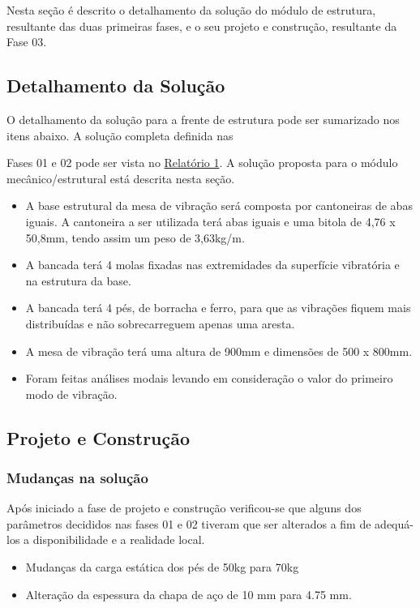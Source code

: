 \label{desenvolvimento_estrutura}
Nesta seção é descrito o detalhamento da solução do módulo de estrutura, resultante das duas primeiras fases,
e o seu projeto e construção, resultante da Fase 03.

\subsection{Detalhamento da Solução}

 O detalhamento da solução para a frente de estrutura pode ser sumarizado nos itens abaixo. A solução completa definida nas

  Fases 01 e 02 pode ser vista no \href{https://drive.google.com/file/d/0B5InkGKx6O-MR1B3eVYzZFpjQ3c/view?usp=sharing}{Relatório 1}.
 A solução proposta para o módulo mecânico/estrutural está descrita nesta seção.

 \begin{itemize}
  \item A base estrutural da mesa de vibração será composta por cantoneiras de abas iguais. A cantoneira a ser utilizada terá abas iguais e uma bitola de 4,76 x 50,8mm, tendo assim um peso de 3,63kg/m.
  \item A bancada terá 4 molas fixadas nas extremidades da superfície vibratória e na estrutura da base.
  \item A bancada terá 4 pés, de borracha e ferro, para que as vibrações fiquem mais distribuídas e não sobrecarreguem apenas uma aresta.
  \item A mesa de vibração terá uma altura de 900mm e dimensões de 500 x 800mm.
  \item Foram feitas análises modais levando em consideração o valor do primeiro modo de vibração.
\end{itemize}
\subsection{Projeto e Construção}

\subsubsection*{Mudanças na solução}

Após iniciado a fase de projeto e construção verificou-se que alguns dos parâmetros decididos nas fases 01 e 02 tiveram que ser alterados a fim de adequá-los a 
disponibilidade e a realidade local.
\begin{itemize}
\item Mudanças da carga estática dos pés de 50kg  para 70kg
\item Alteração da espessura da chapa de aço de 10 mm para 4.75 mm.

\end{itemize}

